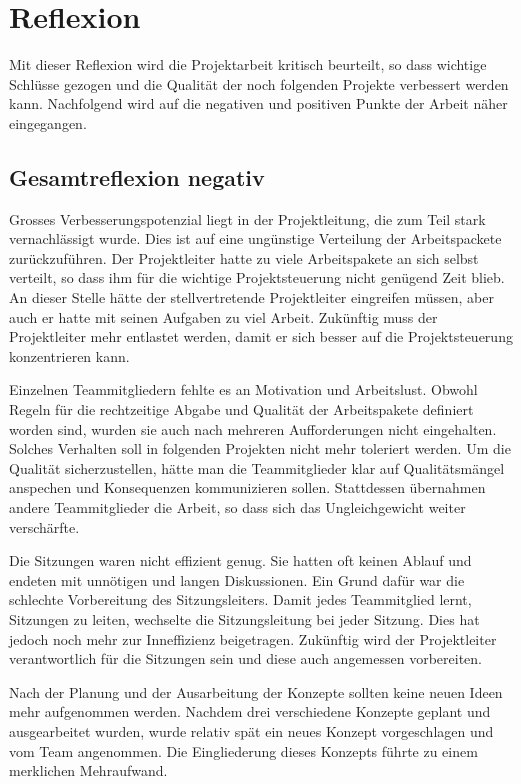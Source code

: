 \section{Reflexion}
\par Mit dieser Reflexion wird die Projektarbeit kritisch beurteilt, so dass wichtige Schlüsse gezogen und die Qualität der noch folgenden Projekte verbessert werden kann. Nachfolgend wird auf die negativen und positiven Punkte der Arbeit näher eingegangen.

\subsection{Gesamtreflexion negativ}
\par Grosses Verbesserungspotenzial liegt in der Projektleitung, die zum Teil stark vernachlässigt wurde. Dies ist auf eine ungünstige Verteilung der Arbeitspackete zurückzuführen. Der Projektleiter hatte zu viele Arbeitspakete an sich selbst verteilt, so dass ihm für die wichtige Projektsteuerung nicht genügend Zeit blieb. An dieser Stelle hätte der stellvertretende Projektleiter eingreifen müssen, aber auch er hatte mit seinen Aufgaben zu viel Arbeit. Zukünftig muss der Projektleiter mehr entlastet werden, damit er sich besser auf die Projektsteuerung konzentrieren kann.
\par Einzelnen Teammitgliedern fehlte es an Motivation und Arbeitslust. Obwohl Regeln für die rechtzeitige Abgabe und Qualität der Arbeitspakete definiert worden sind, wurden sie auch nach mehreren Aufforderungen nicht eingehalten. Solches Verhalten soll in folgenden Projekten nicht mehr toleriert werden. Um die Qualität sicherzustellen, hätte man die Teammitglieder klar auf Qualitätsmängel anspechen und Konsequenzen kommunizieren sollen. Stattdessen übernahmen andere Teammitglieder die Arbeit, so dass sich das Ungleichgewicht weiter verschärfte. 
\par Die Sitzungen waren nicht effizient genug. Sie hatten oft keinen Ablauf und endeten mit unnötigen und langen Diskussionen. Ein Grund dafür war die schlechte Vorbereitung des Sitzungsleiters. Damit jedes Teammitglied lernt, Sitzungen zu leiten, wechselte die Sitzungsleitung bei jeder Sitzung. Dies hat jedoch noch mehr zur Inneffizienz beigetragen. Zukünftig wird der Projektleiter verantwortlich für die Sitzungen sein und diese auch angemessen vorbereiten.
\par Nach der Planung und der Ausarbeitung der Konzepte sollten keine neuen Ideen mehr aufgenommen werden. Nachdem drei verschiedene Konzepte geplant und ausgearbeitet wurden, wurde relativ spät ein neues Konzept vorgeschlagen und vom Team angenommen. Die Eingliederung dieses Konzepts führte zu einem merklichen Mehraufwand.

